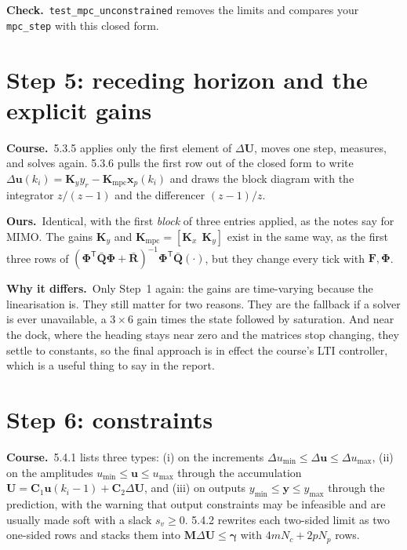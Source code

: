 \documentclass[11pt,a4paper]{article}
\newcommand{\vect}[1]{\bm{#1}}
\newcommand{\mat}[1]{\bm{#1}}
\newcommand{\T}{^{\mathsf{T}}}
\newcommand{\dU}{\Delta\vect{U}}
\newcommand{\du}{\Delta\vect{u}}
\newcommand{\Np}{N_p}
\newcommand{\Nc}{N_c}
\newcommand{\Qbar}{\bar{\mat{Q}}}
\newcommand{\Rbar}{\bar{\mat{R}}}
\newcommand{\course}{\textbf{\textcolor{blue!60!black}{Course.}}\ }
\newcommand{\ours}{\textbf{\textcolor{green!45!black}{Ours.}}\ }
\newcommand{\why}{\textbf{\textcolor{red!60!black}{Why it differs.}}\ }
\newcommand{\tcheck}{\textbf{Check.}\ }
\begin{document}
\tcheck \texttt{test\_mpc\_unconstrained} removes the limits and compares your \texttt{mpc\_step} with this closed form.

\section{Step 5: receding horizon and the explicit gains}
\course 5.3.5 applies only the first element of $\dU$, moves one step, measures, and solves again. 5.3.6 pulls the first row out of the closed form to write $\du(k_i) = \mat K_y y_r - \mat K_{\mathrm{mpc}}\vect x_p(k_i)$ and draws the block diagram with the integrator $z/(z-1)$ and the differencer $(z-1)/z$.

\ours Identical, with the first \emph{block} of three entries applied, as the notes say for MIMO. The gains $\mat K_y$ and $\mat K_{\mathrm{mpc}} = [\mat K_x\ \ \mat K_y]$ exist in the same way, as the first three rows of $(\mat\Phi\T\Qbar\mat\Phi + \Rbar)^{-1}\mat\Phi\T\Qbar(\cdot)$, but they change every tick with $\mat F, \mat\Phi$.

\why Only Step~1 again: the gains are time-varying because the linearisation is. They still matter for two reasons. They are the fallback if a solver is ever unavailable, a $3\times6$ gain times the state followed by saturation. And near the dock, where the heading stays near zero and the matrices stop changing, they settle to constants, so the final approach is in effect the course's LTI controller, which is a useful thing to say in the report.

\section{Step 6: constraints}
\course 5.4.1 lists three types: (i) on the increments $\Delta u_{\min}\le\du\le\Delta u_{\max}$, (ii) on the amplitudes $u_{\min}\le\vect u\le u_{\max}$ through the accumulation $\vect U = \mat C_1\vect u(k_i-1) + \mat C_2\dU$, and (iii) on outputs $y_{\min}\le\vect y\le y_{\max}$ through the prediction, with the warning that output constraints may be infeasible and are usually made soft with a slack $s_v\ge 0$. 5.4.2 rewrites each two-sided limit as two one-sided rows and stacks them into $\mat M\dU\le\vect\gamma$ with $4m\Nc + 2p\Np$ rows.
\end{document}
